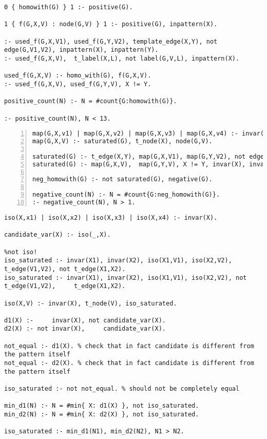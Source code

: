 \lstset{basicstyle=\footnotesize\ttfamily,breaklines=true}
\begin{lstlisting}[caption=ASP positive matching, style=model]
0 { homowith(G) } 1 :- positive(G).

1 { f(G,X,V) : node(G,V) } 1 :- positive(G), inpattern(X).

:- used_f(G,X,V1), used_f(G,Y,V2), template_edge(X,Y), not edge(G,V1,V2), inpattern(X), inpattern(Y).
:- used_f(G,X,V),  t_label(X,L), not label(G,V,L), inpattern(X).

used_f(G,X,V) :- homo_with(G), f(G,X,V).
:- used_f(G,X,V), used_f(G,Y,V), X != Y.

positive_count(N) :- N = #count{G:homowith(G)}.

:- positive_count(N), N < 13.
\end{lstlisting}

\begin{lstlisting}[caption=ASP negative matching using saturation technique, label={lst:aspsaturation}, style=model, numbers=left]
map(G,X,v1) | map(G,X,v2) | map(G,X,v3) | map(G,X,v4) :- invar(X), negative(G). @\label{lstline:probspec}@
map(G,X,V) :- saturated(G), t_node(X), node(G,V).

saturated(G) :- t_edge(X,Y), map(G,X,V1), map(G,Y,V2), not edge(G,V1,V2), negative(G), invar(X), invar(Y).
saturated(G) :- map(G,X,V),  map(G,Y,V), X != Y, invar(X), invar(Y). // we cannot map two different template nodes to the same 

neg_homowith(G) :- not saturated(G), negative(G).

negative_count(N) :- N = #count{G:neg_homowith(G)}.
:- negative_count(N), N > 1.

\end{lstlisting}

\begin{lstlisting}[caption=ASP Canonicity template-based check, style=model]
iso(X,x1) | iso(X,x2) | iso(X,x3) | iso(X,x4) :- invar(X).

candidate_var(X) :- iso(_,X).

%not iso!
iso_saturated :- invar(X1), invar(X2), iso(X1,V1), iso(X2,V2),     t_edge(V1,V2), not t_edge(X1,X2). 
iso_saturated :- invar(X1), invar(X2), iso(X1,V1), iso(X2,V2), not t_edge(V1,V2),     t_edge(X1,X2).

iso(X,V) :- invar(X), t_node(V), iso_saturated.

d1(X) :-     invar(X), not candidate_var(X). 
d2(X) :- not invar(X),     candidate_var(X).

not_equal :- d1(X). % check that in fact candidate is different from the pattern itself
not_equal :- d2(X). % check that in fact candidate is different from the pattern itself

iso_saturated :- not not_equal. % should not be completely equal

min_d1(N) :- N = #min{ X: d1(X) }, not iso_saturated.
min_d2(N) :- N = #min{ X: d2(X) }, not iso_saturated.

iso_saturated :- min_d1(N1), min_d2(N2), N1 > N2.
\end{lstlisting}

